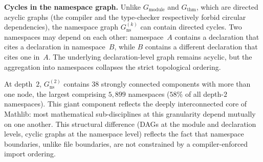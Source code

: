 \noindent\textbf{Cycles in the namespace graph.}
\label{rem:ns-cycles}
Unlike $G_{\mathrm{module}}$ and $G_{\mathrm{thm}}$, which are directed acyclic graphs (the compiler and the type-checker respectively forbid circular dependencies), the namespace graph $G_{\mathrm{ns}}^{(k)}$ can contain directed cycles. Two namespaces may depend on each other: namespace~$A$ contains a declaration that cites a declaration in namespace~$B$, while $B$ contains a different declaration that cites one in~$A$. The underlying declaration-level graph remains acyclic, but the aggregation into namespaces collapses the strict topological ordering.

At depth~$2$, $G_{\mathrm{ns}}^{(2)}$ contains $38$ strongly connected components with more than one node, the largest comprising $5{,}899$ namespaces ($58\%$ of all depth-$2$ namespaces). This giant component reflects the deeply interconnected core of Mathlib: most mathematical sub-disciplines at this granularity depend mutually on one another. This structural difference (DAGs at the module and declaration levels, cyclic graphs at the namespace level) reflects the fact that namespace boundaries, unlike file boundaries, are not constrained by a compiler-enforced import ordering.

